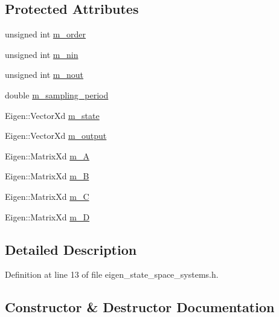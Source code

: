 \subsection*{Protected Attributes}
\begin{DoxyCompactItemize}
\item 
unsigned int \hyperlink{classeigen__control__toolbox_1_1_discrete_state_space_af226df79174f11922017e18ebb45e89b}{m\+\_\+order}
\item 
unsigned int \hyperlink{classeigen__control__toolbox_1_1_discrete_state_space_a28d1ee83fe68a634516e4bcf53990954}{m\+\_\+nin}
\item 
unsigned int \hyperlink{classeigen__control__toolbox_1_1_discrete_state_space_a709da4473200de4bfff97932bf3efd64}{m\+\_\+nout}
\item 
double \hyperlink{classeigen__control__toolbox_1_1_discrete_state_space_a2762ef0b3292b24ebef3b7ba24501cc4}{m\+\_\+sampling\+\_\+period}
\item 
Eigen\+::\+Vector\+Xd \hyperlink{classeigen__control__toolbox_1_1_discrete_state_space_afd14e426784cd7a76ee6e5258e3602b0}{m\+\_\+state}
\item 
Eigen\+::\+Vector\+Xd \hyperlink{classeigen__control__toolbox_1_1_discrete_state_space_ae78eb5b248f0780f0c417eafa2b85a6b}{m\+\_\+output}
\item 
Eigen\+::\+Matrix\+Xd \hyperlink{classeigen__control__toolbox_1_1_discrete_state_space_a3ced02e4b0aa4d87b9739f452aa208b8}{m\+\_\+A}
\item 
Eigen\+::\+Matrix\+Xd \hyperlink{classeigen__control__toolbox_1_1_discrete_state_space_a070fcc68df2ae0b39af3d308a1c5011f}{m\+\_\+B}
\item 
Eigen\+::\+Matrix\+Xd \hyperlink{classeigen__control__toolbox_1_1_discrete_state_space_ac3a719d7d124200b9d67b9df525024bb}{m\+\_\+C}
\item 
Eigen\+::\+Matrix\+Xd \hyperlink{classeigen__control__toolbox_1_1_discrete_state_space_a1f3638e25fd3c1fb9187426133a1a6e3}{m\+\_\+D}
\end{DoxyCompactItemize}


\subsection{Detailed Description}


Definition at line 13 of file eigen\+\_\+state\+\_\+space\+\_\+systems.\+h.



\subsection{Constructor \& Destructor Documentation}

